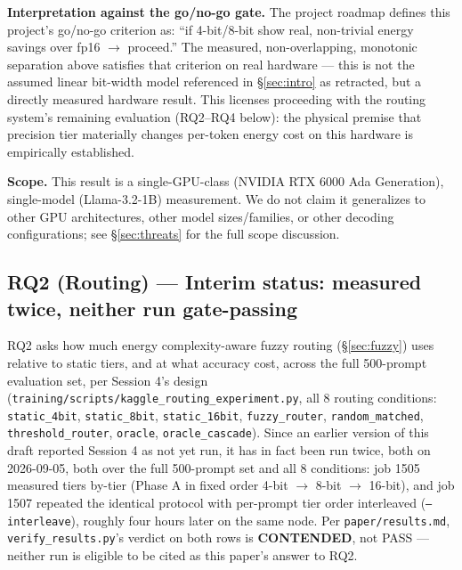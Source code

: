 \documentclass[conference]{IEEEtran}
\begin{document}
\textbf{Interpretation against the go/no-go gate.} The project roadmap
defines this project's go/no-go criterion as: ``if 4-bit/8-bit show real,
non-trivial energy savings over fp16 $\rightarrow$ proceed.'' The
measured, non-overlapping, monotonic separation above satisfies that
criterion on real hardware --- this is not the assumed linear bit-width
model referenced in \S\ref{sec:intro} as retracted, but a directly
measured hardware result. This licenses proceeding with the routing
system's remaining evaluation (RQ2--RQ4 below): the physical premise that
precision tier materially changes per-token energy cost on this hardware
is empirically established.

\textbf{Scope.} This result is a single-GPU-class (NVIDIA RTX 6000 Ada
Generation), single-model (Llama-3.2-1B) measurement. We do not claim it
generalizes to other GPU architectures, other model sizes/families, or
other decoding configurations; see \S\ref{sec:threats} for the full
scope discussion.

\subsection{RQ2 (Routing) --- Interim status: measured twice, neither run gate-passing}
\label{sec:rq2}

RQ2 asks how much energy complexity-aware fuzzy routing
(\S\ref{sec:fuzzy}) uses relative to static tiers, and at what accuracy
cost, across the full 500-prompt evaluation set, per Session 4's design
(\texttt{training/scripts/kaggle\_routing\_experiment.py}, all 8 routing
conditions: \texttt{static\_4bit}, \texttt{static\_8bit},
\texttt{static\_16bit}, \texttt{fuzzy\_router}, \texttt{random\_matched},
\texttt{threshold\_router}, \texttt{oracle}, \texttt{oracle\_cascade}).
Since an earlier version of this draft reported Session 4 as not yet run,
it has in fact been run twice, both on 2026-09-05, both over the full
500-prompt set and all 8 conditions: job 1505 measured tiers by-tier
(Phase A in fixed order 4-bit $\rightarrow$ 8-bit $\rightarrow$ 16-bit),
and job 1507 repeated the identical protocol with per-prompt tier order
interleaved (\texttt{--interleave}), roughly four hours later on the same
node. Per \texttt{paper/results.md}, \texttt{verify\_results.py}'s
verdict on both rows is \textbf{CONTENDED}, not PASS --- neither run is
eligible to be cited as this paper's answer to RQ2.
\end{document}
